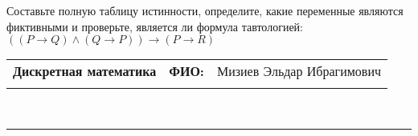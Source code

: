 \documentclass[10pt]{exam}
\newcommand{\class}{Дискретная математика}
\newcommand{\examdate}{}
\begin{document}
\begin{questions}
\begin{enumerate}[a)]
\end{enumerate}\question Составьте полную таблицу истинности, определите, какие переменные являются фиктивными и проверьте, является ли формула тавтологией:
$(( P \rightarrow Q) \land (Q \rightarrow P)) \rightarrow (P \rightarrow R)$

\end{questions}
\newpage
\begin{flushright}
\begin{tabular}{p{2.8in} r l}
\textbf{\class} & \textbf{ФИО:} &Мизиев Эльдар Ибрагимович
\\

\textbf{\examdate} &&\\
\end{tabular}\\
\end{flushright}
\rule[1ex]{\textwidth}{.1pt}
\end{document}
